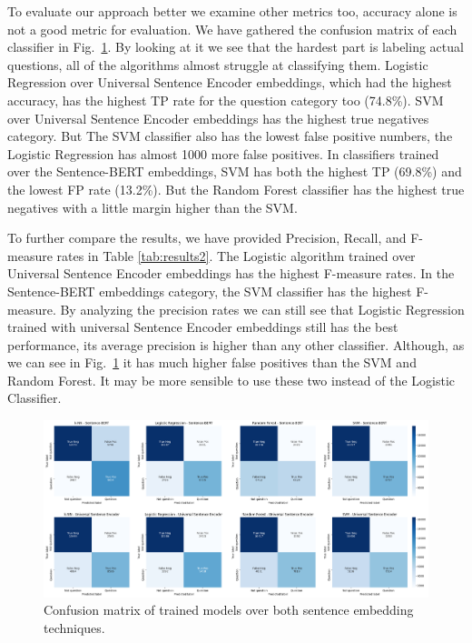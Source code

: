 \documentclass[conference]{IEEEtran}
\begin{document}
To evaluate our approach better we examine other metrics too, accuracy alone is not a good metric for 
evaluation. We have gathered the confusion matrix of each classifier in Fig.~\ref{fig:cfheatmap}. 
By looking at it we see that the hardest part is labeling actual questions, all of the algorithms almost 
struggle at classifying them. Logistic Regression over Universal Sentence Encoder embeddings, which had 
the highest accuracy, has the highest TP rate for the question category too (74.8\%). SVM over 
Universal Sentence Encoder embeddings has the highest true negatives category. 
But The SVM classifier also has the lowest false positive numbers, the Logistic Regression has almost 1000 more 
false positives. In classifiers trained over the Sentence-BERT embeddings, SVM has both the highest TP (69.8\%) 
and the lowest FP rate (13.2\%). But the Random Forest classifier has the highest true negatives with a 
little margin higher than the SVM.

To further compare the results, we have provided Precision, Recall, and F-measure rates in Table \ref{tab:results2}.
The Logistic algorithm trained over Universal Sentence Encoder embeddings has the highest F-measure rates.
In the Sentence-BERT embeddings category, the SVM classifier has the highest F-measure. By analyzing the precision 
rates we can still see that Logistic Regression trained with universal Sentence Encoder embeddings still has 
the best performance, its average precision is higher than any other classifier. 
Although, as we can see in Fig.~\ref{fig:cfheatmap} it has much higher false positives than the SVM and 
Random Forest. It may be more sensible to use these two instead of the Logistic Classifier.

\begin{figure}[t]
  \centerline{\includegraphics[width=7.16in]{./figures/cf-heatmaps8.png}}
  \caption{Confusion matrix of trained models over both sentence embedding techniques.}
  \label{fig:cfheatmap}
\end{figure}
\end{document}
